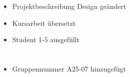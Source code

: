 \section{}
\begin{itemize}
	\item Projektbeschreibung Design geändert
	\item Kursarbeit übersetzt
	\item Student 1-5 ausgefüllt
\end{itemize}



\section{}
\begin{itemize}
	\item Gruppennummer A25-07 hinzugefügt
\end{itemize}